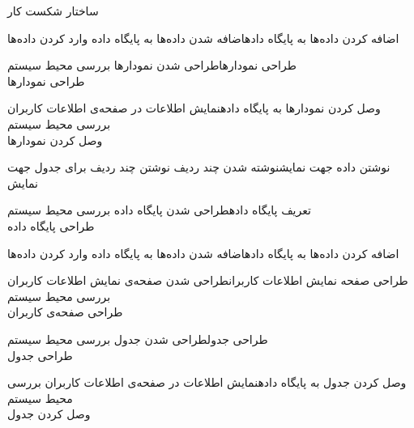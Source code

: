 \begin{wbsbox}{ساختار شکست کار}
\begin{wbssub}{اضافه کردن داده‌ها به پایگاه داده}{اضافه شدن داده‌ها به پایگاه داده}{}
\task وارد کردن داده‌ها
\end{wbssub}

\begin{wbssub}{طراحی نمودارها}{طراحی شدن نمودارها}{}
\task بررسی محیط سیستم  \\
\task طراحی نمودار‌ها
\end{wbssub}

\begin{wbssub}{وصل کردن نمودارها به پایگاه داده}{نمایش اطلاعات در صفحه‌ی اطلاعات کاربران}{}
\task بررسی محیط سیستم  \\
\task وصل کردن نمودارها
\end{wbssub}

\begin{wbssub}{نوشتن داده جهت نمایش}{نوشته شدن چند ردیف}{}
\task نوشتن چند ردیف برای جدول جهت نمایش
\end{wbssub}

\begin{wbssub}{تعریف پایگاه داده}{طراحی شدن پایگاه داده}{}
\task بررسی محیط سیستم  \\
\task طراحی پایگاه داده
\end{wbssub}

\begin{wbssub}{اضافه کردن داده‌ها به پایگاه داده}{اضافه شدن داده‌ها به پایگاه داده}{}
\task وارد کردن داده‌ها
\end{wbssub}

\begin{wbssub}{طراحی صفحه نمایش اطلاعات کاربران}{طراحی شدن صفحه‌ی نمایش اطلاعات کاربران}{}
\task بررسی محیط سیستم  \\
\task طراحی صفحه‌ی کاربران
\end{wbssub}

\begin{wbssub}{طراحی جدول}{طراحی شدن جدول}{}
\task بررسی محیط سیستم  \\
\task طراحی جدول
\end{wbssub}

\begin{wbssub}{وصل کردن جدول به پایگاه داده}{نمایش اطلاعات در صفحه‌ی اطلاعات کاربران}{}
\task بررسی محیط سیستم  \\
\task وصل کردن جدول
\end{wbssub}
\end{wbsbox}
